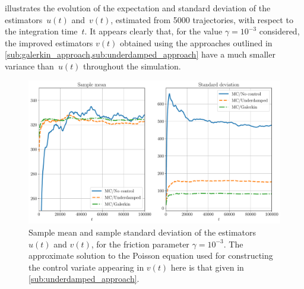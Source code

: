 \documentclass[11pt,a4paper]{article}
\theoremstyle{plain}
\numberwithin{equation}{section}
\begin{document}
 illustrates the evolution of the expectation and standard deviation of the estimators~$u(t)$ and~$v(t)$,
estimated from 5000 trajectories,
with respect to the integration time~$t$.
It appears clearly that,
for the value $\gamma = 10^{-3}$ considered,
the improved estimators $v(t)$ obtained using the approaches outlined in \cref{sub:galerkin_approach,sub:underdamped_approach}
have a much smaller variance than~$u(t)$ throughout the simulation.
\begin{figure}[ht]
    \centering
    \includegraphics[width=0.99\linewidth]{figures/time.pdf}
    \caption{
        Sample mean and sample standard deviation of the estimators $u(t)$ and $v(t)$,
        for the friction parameter $\gamma = 10^{-3}$.
        The approximate solution to the Poisson equation used for constructing the control variate appearing in $v(t)$ here
        is that given in \cref{sub:underdamped_approach}.
    }%
    \label{fig:time_bias_variance}
\end{figure}
\end{document}
